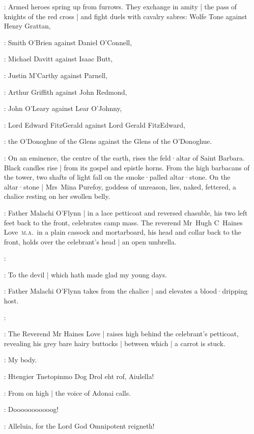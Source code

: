 :
Armed heroes spring up from furrows.
They exchange in amity |
the pass of knights of the red cross |
and fight duels with cavalry sabres:
Wolfe Tone against Henry Grattan,

:
Smith O'Brien against Daniel O'Connell,

:
Michael Davitt against Isaac Butt,

:
Justin M'Carthy against Parnell,

:
Arthur Griffith against John Redmond,

:
John O'Leary against Lear O'Johnny,

:
Lord Edward FitzGerald against Lord Gerald FitzEdward,

:
the O'Donoghue of the Glens against the Glens of the O'Donoghue.

:
On an eminence,
the centre of the earth,
rises the feld·altar of Saint Barbara.
Black candles rise |
from its gospel and epistle horns.
%
From the high barbacans of the tower,
two shafts of light fall on the smoke·palled altar·stone.
On the altar·stone |
Mrs~Mina Purefoy,
goddess of unreason,
lies,
naked,
fettered,
a chalice resting on her swollen belly.

:
Father Malachi O'Flynn |
in a lace petticoat and reversed chasuble,
his two left feet back to the front,
celebrates camp mass.
The reverend Mr~Hugh C~Haines Love~\textsc{m.a.}\ 
in a plain cassock and mortarboard,
his head and collar back to the front,
holds over the celebrant's head |
an open umbrella.

\FrMalachiOFlynn[1]:

\HainesLove[2]:
To the devil |
which hath made glad my young days.

:
Father Malachi O'Flynn takes from the chalice |
and elevates a blood·dripping host.

\FrMalachiOFlynn:

:
The Reverend Mr Haines Love |
raises high behind the celebrant's petticoat,
revealing his grey bare hairy buttocks |
between which |
a carrot is stuck.

\HainesLove:
My body.

\VoiceAllDamned[2]:
Htengier Tnetopinmo Dog Drol eht rof,
Aiulella!

:
From on high |
the voice of Adonai calls.

\Adonai:
Dooooooooooog!

\VoiceAllBlessed[1]:
Alleluia,
for the Lord God Omnipotent reigneth!

